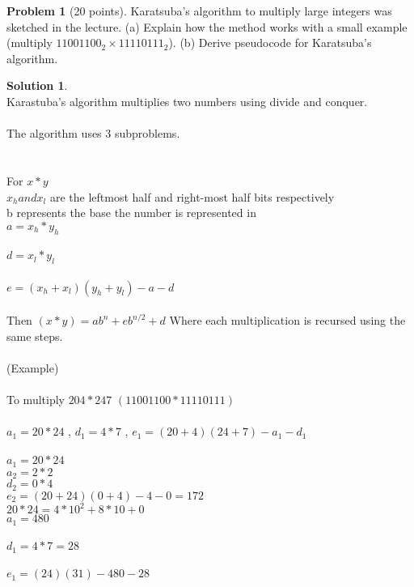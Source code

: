 \documentclass{article}
\theoremstyle{definition}
\newtheorem{problem}{Problem}
\newtheorem*{solution}{Solution}
\begin{document}
\newpage

\begin{problem}[20 points]
Karatsuba's algorithm to multiply large integers was sketched in the
lecture. (a) Explain how the method works with a small example (multiply
$11001100_2 \times 11110111_2$). (b) Derive pseudocode for
Karatsuba's algorithm. 
\end{problem}
\begin{solution} \\
Karastuba's algorithm multiplies two numbers using divide and conquer. \\ \\
The algorithm uses 3 subproblems.\\
\\
\\
For $x*y$\\
$x_h and x_l$ are the leftmost half and right-most half bits respectively \\
b represents the base the number is represented in\\
$a = x_h*y_h$\\
\\
$d = x_l*y_l$\\
\\
$e = (x_h + x_l)(y_h + y_l)- a - d $\\
\\
Then $(x*y) = ab^n + eb^{n/2} + d$
Where each multiplication is recursed using the same steps.\\
\\
(Example)\\
\\
To multiply $204 * 247$ $(11001100 * 11110111)$\\
\\
$a_1 = 20 *24 $ , $d_1 = 4 * 7 $ , $ e_1 = (20+4)(24+7) - a_1 - d_1$\\
\\
$a_1 = 20 * 24 $\\
\indent     $a_2 = 2 * 2 $\\
\indent     $d_2 = 0 * 4$\\
\indent     $e_2 = (20 + 24)(0 + 4) - 4 - 0 = 172$\\
\indent     $20*24 = 4*10^2 + 8*10 + 0$\\
\indent     $a_1 = 480$
\\
\\
$d_1 = 4 * 7  = 28$\\
\\
$e_1 = (24)(31) - 480 - 28$\\

\end{solution}
\end{document}

